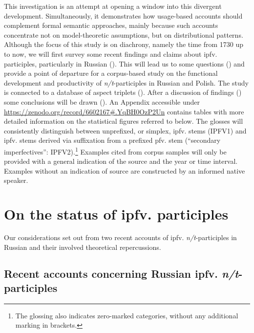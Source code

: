 \documentclass[output=paper]{langscibook}
\begin{document}
This investigation is an attempt at opening a window into this divergent development. Simultaneously, it demonstrates how usage-based accounts should complement formal semantic approaches, mainly because such accounts concentrate not on model-theoretic assumptions, but on distributional patterns. Although the focus of this study is on diachrony, namely the time from 1730 up to now, we will first survey some recent findings and claims about ipfv. participles, particularly in Russian (). This will lead us to some questions () and provide a point of departure for a corpus-based study on the functional development and productivity of \textit{n/t}-participles in Russian and Polish. The study is connected to a database of aspect triplets (). After a discussion of findings () some conclusions will be drawn (). An Appendix accessible under \url{https://zenodo.org/record/6602167#.YqBH0OzP2Un} contains tables with more detailed information on the statistical figures referred to below. The glosses will consistently distinguish between unprefixed, or simplex, ipfv. stems (IPFV1) and ipfv. stems derived via suffixation from a prefixed pfv. stem (``secondary imperfectives'': IPFV2).\footnote{The glossing also indicates zero-marked categories, without any additional marking in brackets.} Examples cited from corpus samples will only be provided with a general indication of the source and the year or time interval. Examples without an indication of source are constructed by an informed native speaker.

\section{On the status of ipfv. participles}\label{wiem:sec:status-participles}

Our considerations set out from two recent accounts of ipfv. \textit{n/t}-participles in Russian and their involved theoretical repercussions.

\subsection{Recent accounts concerning Russian ipfv. \textit{n/t}-participles}\label{wiem:sec:recent-accounts}
\end{document}
